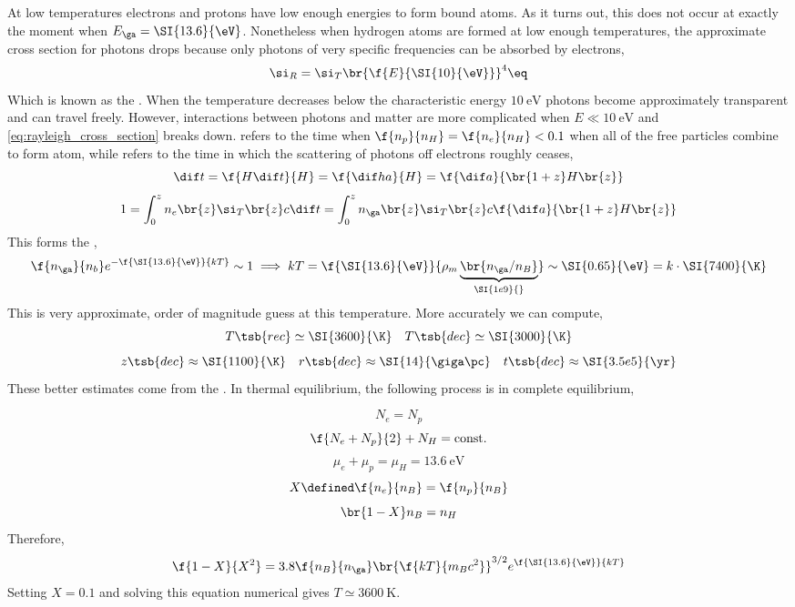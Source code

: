 \documentclass{article}
\begin{document}
At low temperatures electrons and protons have low enough energies to form bound atoms. As it turns out, this does not occur at exactly the moment when $E_\ga = \SI{13.6}{\eV}$. Nonetheless when hydrogen atoms are formed at low enough temperatures, the approximate cross section for photons drops because only photons of very specific frequencies can be absorbed by electrons,
\[ \si_R = \si_T \br{\f{E}{\SI{10}{\eV}}}^{4} \eq \label{eq:rayleigh_cross_section}\]
Which is known as the . When the temperature decreases below the characteristic energy $\SI{10}{\eV}$ photons become approximately transparent and can travel freely. However, interactions between photons and matter are more complicated when $E \ll \SI{10}{\eV}$ and \cref{eq:rayleigh_cross_section} breaks down.  refers to the time when $\f{n_p}{n_H} = \f{n_e}{n_H} < 0.1$ when all of the free particles combine to form atom, while  refers to the time in which the scattering of photons off electrons roughly ceases,
\[ \dif t = \f{H \dif t}{H} = \f{\dif h a}{H} = \f{\dif a}{\br{1 + z} H\br{z}} \]
\[ 1 = \int_0^z n_e\br{z} \si_T \br{z} c \dif t = \int_0^z n_\ga\br{z} \si_T \br{z} c \f{\dif a}{\br{1 + z} H\br{z}} \]
This forms the ,
\[ \f{n_\ga}{n_b}e^{-\f{\SI{13.6}{\eV}}{kT}} \sim 1 \implies kT = \f{\SI{13.6}{\eV}}{\rho_m \underbrace{\br{n_\ga / n_B}}_{\SI{1e9}{}}} \sim \SI{0.65}{\eV} = k \cdot \SI{7400}{\K} \]
This is very approximate, order of magnitude guess at this temperature. More accurately we can compute,
\[ T\tsb{rec} \simeq \SI{3600}{\K} \quad T\tsb{dec} \simeq \SI{3000}{\K} \]
\[ z\tsb{dec} \approx \SI{1100}{\K} \quad r\tsb{dec} \approx \SI{14}{\giga\pc} \quad t\tsb{dec} \approx \SI{3.5e5}{\yr} \]
These better estimates come from the . In thermal equilibrium, the following process is in complete equilibrium,
\begin{center}
\end{center}

\[ N_e = N_p \]
\[ \f{N_e + N_p}{2} + N_H = \text{const.}  \]
\[ \mu_e + \mu_p = \mu_H = \SI{13.6}{\eV} \]
\[ X \defined \f{n_e}{n_B} = \f{n_p}{n_B} \]
\[ \br{1 - X}n_B = n_H \]
Therefore,
\[ \f{1 - X}{X^2} = 3.8 \f{n_B}{n_\ga}\br{\f{kT}{m_B c^2}}^{3/2}  e^{\f{\SI{13.6}{\eV}}{kT}} \]
Setting $X = 0.1$ and solving this equation numerical gives $T \simeq \SI{3600}{\K}$.
\end{document}
